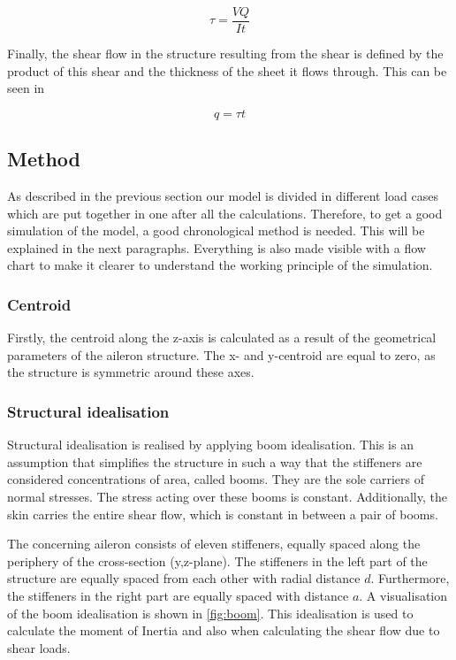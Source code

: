 \begin{equation}
    \tau = \frac{V Q}{I t}
    \label{eq:bending_shear}
\end{equation}

Finally, the shear flow in the structure resulting from the shear is defined by the product of this shear and the thickness of the sheet it flows through. This can be seen in 

\begin{equation}
\label{eq:shearflow}
    q=\tau t
\end{equation}
\subsection{Method}
As described in the previous section our model is divided in different load cases which are put together in one after all the calculations. Therefore, to get a good simulation of the model, a good chronological method is needed. This will be explained in the next paragraphs. Everything is also made visible with a flow chart to make it clearer to understand the working principle of the simulation.

\subsubsection{Centroid}
Firstly, the centroid along the z-axis is calculated as a result of the geometrical parameters of the aileron structure. The x- and y-centroid are equal to zero, as the structure is symmetric around these axes.

\subsubsection{Structural idealisation}
\label{subsubsec:boom}
Structural idealisation is realised by applying boom idealisation. This is an assumption that simplifies the structure in such a way that the stiffeners are considered concentrations of area, called booms. They are the sole carriers of normal stresses. The stress acting over these booms is constant. Additionally, the skin carries the entire shear flow, which is constant in between a pair of booms.

The concerning aileron consists of eleven stiffeners, equally spaced along the periphery of the cross-section (y,z-plane). The stiffeners in the left part of the structure are equally spaced from each other with radial distance $d$. Furthermore, the stiffeners in the right part are equally spaced with distance $a$. A visualisation of the boom idealisation is shown in \autoref{fig:boom}.
This idealisation is used to calculate the moment of Inertia and also when calculating the shear flow due to shear loads.

